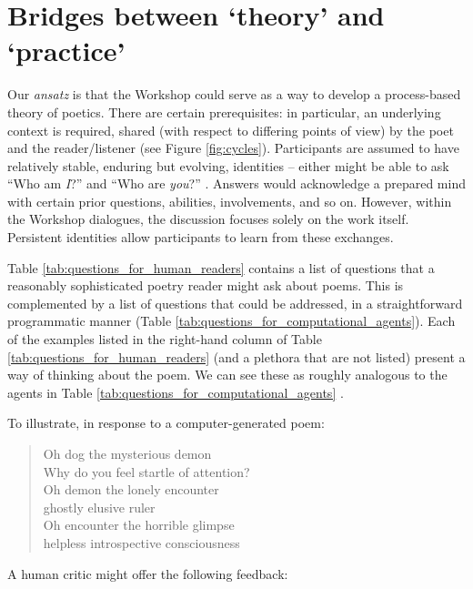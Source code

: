 \section{Bridges between `theory' and `practice'}

Our \emph{ansatz} is that the Workshop could serve as a way to develop a process-based theory of poetics.
There are certain prerequisites: in particular, an underlying context is required, shared
(with respect to differing points of view) by the poet and the reader/listener
(see Figure \ref{fig:cycles}).  Participants are assumed to
have relatively stable, enduring but evolving, identities -- either might be able to ask
``Who am \emph{I}?''  and ``Who are \emph{you}?'' \cite[p. 251]{bakhtin1984problems}. 
Answers would acknowledge a prepared mind with certain prior questions, abilities, involvements, and so on.
However, within the Workshop dialogues, the discussion focuses solely on the work itself.
Persistent identities allow participants to learn from these exchanges.

Table \ref{tab:questions_for_human_readers} contains a list of questions that a reasonably
sophisticated poetry reader might ask about poems.  This is complemented by a list of
questions that could be addressed, in a straightforward programmatic manner (Table \ref{tab:questions_for_computational_agents}).  
Each of the examples listed in the right-hand column of Table \ref{tab:questions_for_human_readers} (and a plethora
that are not listed) present a way of thinking about the poem.  We can see these as roughly analogous to the agents in Table \ref{tab:questions_for_computational_agents} \cite{minsky2006emotion}.

To illustrate, in response to a computer-generated poem:

{\itshape
\begin{verse}
%
Oh dog the mysterious demon\\
Why do you feel startle of attention?\\
Oh demon the lonely encounter\\
ghostly elusive ruler\\
Oh encounter the horrible glimpse\\
helpless introspective consciousness\\
\end{verse}
}

A human critic might offer the following feedback:

